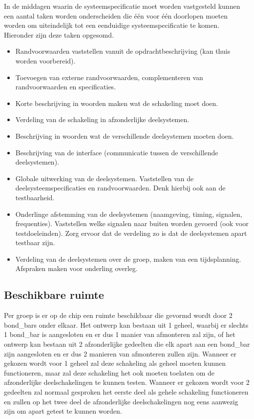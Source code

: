 In de middagen waarin de systeemspecificatie moet worden vastgesteld kunnen
een aantal taken worden onderscheiden die \'e\'en voor \'e\'en doorlopen moeten worden
om uiteindelijk tot een eenduidige systeemspecificatie te komen. Hieronder zijn deze taken opgesomd.
\begin{itemize}

\item    Randvoorwaarden vaststellen vanuit de opdrachtbeschrijving
(kan thuis worden voorbereid).
\item    Toevoegen van externe randvoorwaarden, complementeren
          van randvoorwaarden en specificaties.
\item    Korte beschrijving in woorden maken wat de schakeling moet doen.
\item    Verdeling van de schakeling in afzonderlijke deelsystemen.
\item    Beschrijving in woorden wat de verschillende deelsystemen
          moeten doen.
\item    Beschrijving van de interface (communicatie tussen de
          verschillende deelsystemen).
\item    Globale uitwerking van de deelsystemen. Vaststellen van de
          deelsysteemspecificaties en randvoorwaarden. Denk hierbij ook aan
          de testbaarheid.
\item    Onderlinge afstemming van de deelsystemen (naamgeving,
          timing, signalen, frequenties). Vaststellen welke signalen naar
buiten worden gevoerd (ook voor testdoeleinden). Zorg ervoor dat de verdeling zo is dat de deelsystemen apart testbaar zijn.
\item    Verdeling van de deelsystemen over de groep, maken van een
          tijdsplanning. Afspraken maken voor onderling overleg.
\end{itemize}

\subsection{Beschikbare ruimte}

Per groep is er op de chip een ruimte beschikbaar die gevormd wordt
door 2 bond\_bars onder elkaar.
Het ontwerp kan bestaan uit 1 geheel, waarbij er slechts 1 bond\_bar is aangesloten
en er dus 1 manier van afmonteren zal zijn, of
het ontwerp kan bestaan uit 2 afzonderlijke gedeelten die elk apart aan een
bond\_bar zijn aangesloten en er dus 2 manieren van afmonteren zullen zijn.
Wanneer er gekozen wordt voor 1 geheel zal deze schakeling als geheel moeten kunnen
functioneren, maar zal deze schakeling het ook moeten toelaten om de afzonderlijke
deelschakelingen te kunnen testen.
Wanneer er gekozen wordt voor 2 gedeelten zal normaal gesproken het eerste deel
als gehele schakeling functioneren en zullen op het twee deel de afzonderlijke
deelschakelingen nog eens aanwezig zijn om apart getest te kunnen worden.

